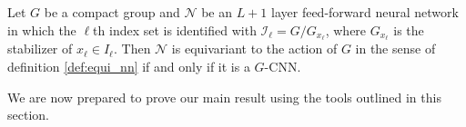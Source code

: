 \begin{theorem} \label{thm:gcnn}
	Let $G$ be a compact group and $\mathcal{N}$ be an $L+1$ layer feed-forward neural network in which the $\ell$th index set is identified with $\mathcal{I}_{\ell} = G / G_{x_{\ell}}$, where $G_{x_{\ell}}$ is the stabilizer of $x_{\ell} \in I_{\ell}$.
	Then $\mathcal{N}$ is equivariant to the action of $G$ in the sense of definition \ref{def:equi_nn} if and only if it is a $G$-CNN.
\end{theorem}

We are now prepared to prove our main result using the tools outlined in this section.
